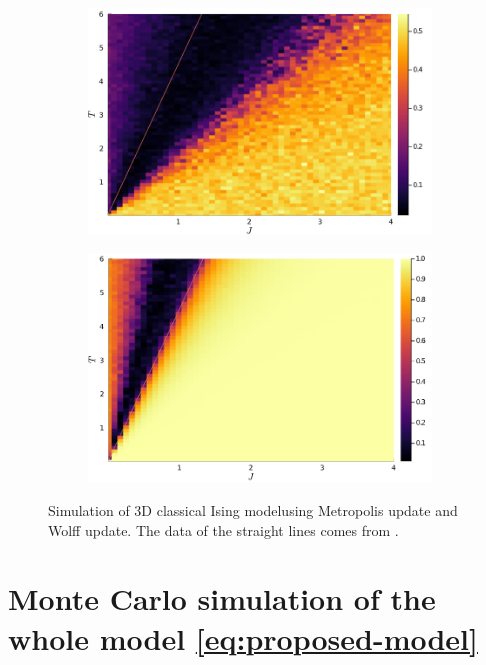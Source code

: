 \documentclass[hyperref, a4paper]{article}
\newcommand*{\cim}{classical Ising model}
\begin{document}
\begin{figure}
\begin{subfigure}{0.45\textwidth}
        \includegraphics[width=\textwidth]{../3d-ising-prototype/examples/isotropic/magnetization-wolff-random-init.PNG}
    \end{subfigure}
    \begin{subfigure}{0.45\textwidth}
        \includegraphics[width=\textwidth]{../3d-ising-prototype/examples/isotropic/magnetization-wolff-ones-init.PNG}
    \end{subfigure}
    \caption{Simulation of 3D \cim using Metropolis update and Wolff update. The data of the straight lines comes from \cite{Talapov_1996}.}
    \label{fig:3d-cim-benchmark}
\end{figure}

\section{Monte Carlo simulation of the whole model \eqref{eq:proposed-model}}


 
\end{document}
